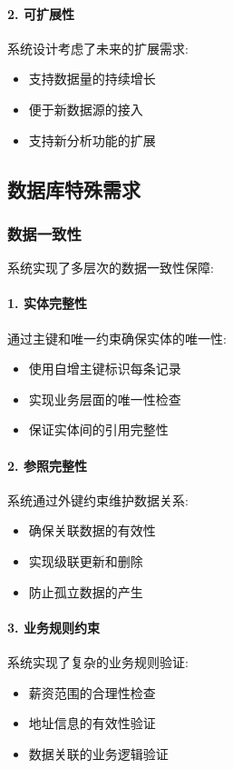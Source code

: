 \paragraph{2. 可扩展性}
系统设计考虑了未来的扩展需求:
\begin{itemize}
    \item 支持数据量的持续增长
    \item 便于新数据源的接入
    \item 支持新分析功能的扩展
\end{itemize}

\subsection{数据库特殊需求}

\subsubsection{数据一致性}

系统实现了多层次的数据一致性保障:

\paragraph{1. 实体完整性}
通过主键和唯一约束确保实体的唯一性:
\begin{itemize}
    \item 使用自增主键标识每条记录
    \item 实现业务层面的唯一性检查
    \item 保证实体间的引用完整性
\end{itemize}

\paragraph{2. 参照完整性}
系统通过外键约束维护数据关系:
\begin{itemize}
    \item 确保关联数据的有效性
    \item 实现级联更新和删除
    \item 防止孤立数据的产生
\end{itemize}

\paragraph{3. 业务规则约束}
系统实现了复杂的业务规则验证:
\begin{itemize}
    \item 薪资范围的合理性检查
    \item 地址信息的有效性验证
    \item 数据关联的业务逻辑验证
\end{itemize}

